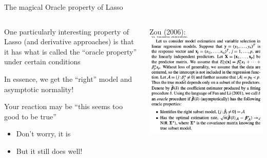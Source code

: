 \documentclass[notes,11pt, aspectratio=169]{beamer}
\newenvironment{wideitemize}{\itemize\addtolength{\itemsep}{10pt}}{\enditemize}
\begin{document}
\begin{frame}{The magical Oracle property of Lasso}
  \begin{columns}[T] %
    \begin{column}{.5\textwidth}
  \begin{wideitemize}
  \item One particularly interesting property of Lasso (and derivative
    approaches) is that it has what is called the ``oracle property''
    under certain conditions
  \item In essence, we get the ``right'' model and asymptotic
    normality!
  \item Your reaction may be ``this seems too good to be true''
    \begin{itemize}
    \item Don't worry, it is
    \item But it still does well!
    \end{itemize}
  \end{wideitemize}
    \end{column}%
  \hfill%
  \begin{column}{.5\textwidth}
    Zou (2006):
    \includegraphics[width=\linewidth]{oracle_property.png}
  \end{column}
\end{columns}
\end{frame}
\end{document}
